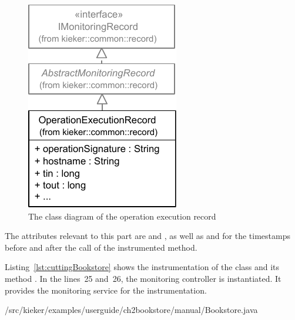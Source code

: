 \begin{figure}[H]
\begin{centering}
\includegraphics[scale=1]{images/kieker_OperationExecutionRecord-notraceattributes-inheritance}%
\caption{The class diagram of the operation execution record}
\label{fig:OperationExecutionRecordClassDiagram}
\end{centering}
\end{figure}

\noindent The attributes relevant to this part are  and , %
as well as  and  for %
the timestamps before and after the call of the instrumented method.

\enlargethispage{0.7cm}

Listing~\ref{lst:cuttingBookstore} shows the instrumentation of the  class and its method . In the lines~25 and~26, the monitoring controller is instantiated. It provides the monitoring service for the instrumentation.


\setJavaCodeListing
%
{\manualInstrumentedBookstoreApplicationDir/src/kieker/examples/userguide/ch2bookstore/manual/Bookstore.java}

